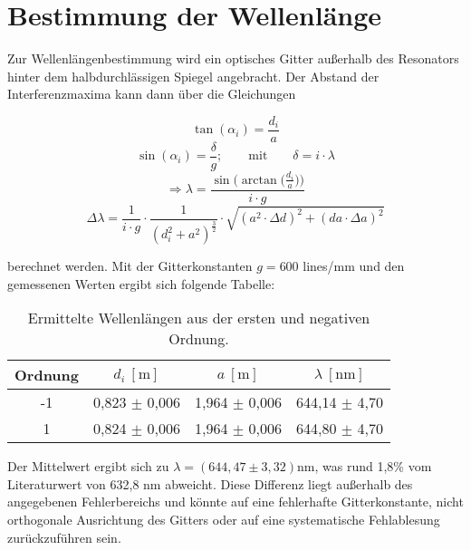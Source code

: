 \chapter{Bestimmung der Wellenlänge}

Zur Wellenlängenbestimmung wird ein optisches Gitter außerhalb des Resonators hinter dem halbdurchlässigen Spiegel angebracht. 
Der Abstand der Interferenzmaxima kann dann über die Gleichungen

\begin{equation*}
    \tan(\alpha_i) = \frac{d_i}{a}
\end{equation*}
\begin{equation*}
    \sin(\alpha_i) = \frac{\delta}{g}; \qquad \text{mit} \qquad \delta = i \cdot \lambda
\end{equation*}
\begin{equation*}
    \Rightarrow \lambda = \frac{\sin\big(\arctan\big(\frac{d_i}{a}\big)\big)}{i \cdot g} \label{eq:Wellenlänge}
\end{equation*}
\begin{equation*}
    \Delta \lambda = \frac{1}{i \cdot g} \cdot \frac{1}{(d_i^2 + a^2)^\frac{3}{2}} \cdot \sqrt{(a^2 \cdot \Delta d)^2 + (da \cdot \Delta a
    )^2}
\end{equation*}

berechnet werden.
Mit der Gitterkonstanten $g = 600$ lines/mm und den gemessenen Werten ergibt sich folgende Tabelle:

\begin{table}[htbp]
    \centering
    \begin{tabular}{c|c|c|c}
        Ordnung & \(d_i ~[\text{m}]\) & \(a ~[\text{m}]\) & \(\lambda~[\text{nm}]\)\\
        \hline 
        -1 & 0,823 \(\pm\) 0,006 & 1,964 \(\pm\) 0,006 & 644,14 \(\pm\) 4,70 \\
        1 & 0,824 \(\pm\) 0,006 & 1,964 \(\pm\) 0,006 & 644,80 \(\pm\) 4,70 \\
    \end{tabular}
    \caption{Ermittelte Wellenlängen aus der ersten und negativen Ordnung.}
    \label{tab:Wellenlänge}
\end{table}


Der Mittelwert ergibt sich zu \(\lambda = (644,47 \pm 3,32)\)nm, was rund 1,8\% vom Literaturwert von 632,8 nm abweicht. 
Diese Differenz liegt außerhalb des angegebenen Fehlerbereichs und könnte auf eine fehlerhafte Gitterkonstante, nicht orthogonale Ausrichtung des Gitters oder auf eine systematische Fehlablesung zurückzuführen sein.


